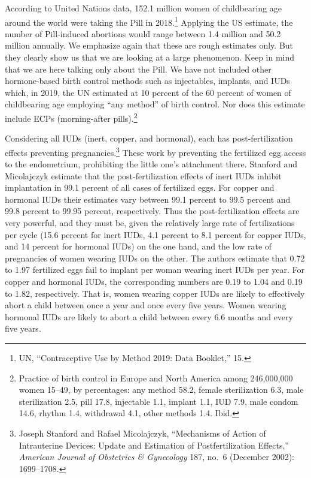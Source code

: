 \documentclass[
]{book}
\begin{document}
According to United Nations data, 152.1 million women of childbearing age around the world were taking the Pill in 2018.\footnote{UN, ``Contraceptive Use by Method 2019: Data Booklet,'' 15.} Applying the US estimate, the number of Pill-induced abortions would range between 1.4 million and 50.2 million annually. We emphasize again that these are rough estimates only. But they clearly show us that we are looking at a large phenomenon. Keep in mind that we are here talking only about the Pill. We have not included other hormone-based birth control methods such as injectables, implants, and IUDs which, in 2019, the UN estimated at 10 percent of the 60 percent of women of childbearing age employing ``any method'' of birth control. Nor does this estimate include ECPs (morning-after pills).\footnote{Practice of birth control in Europe and North America among 246,000,000 women 15--49, by percentages: any method 58.2, female sterilization 6.3, male sterilization 2.5, pill 17.8, injectable 1.1, implant 1.1, IUD 7.9, male condom 14.6, rhythm 1.4, withdrawal 4.1, other methods 1.4. Ibid.}

Considering all IUDs (inert, copper, and hormonal), each has post-fertilization effects preventing pregnancies.\footnote{Joseph Stanford and Rafael Micolajczyk, ``Mechanisms of Action of Intrauterine Devices: Update and Estimation of Postfertilization Effects,'' \emph{American Journal of Obstetrics \& Gynecology} 187, no.~6 (December 2002): 1699--1708.} These work by preventing the fertilized egg access to the endometrium, prohibiting the little one's attachment there. Stanford and Micolajczyk estimate that the post-fertilization effects of inert IUDs inhibit implantation in 99.1 percent of all cases of fertilized eggs. For copper and hormonal IUDs their estimates vary between 99.1 percent to 99.5 percent and 99.8 percent to 99.95 percent, respectively. Thus the post-fertilization effects are very powerful, and they must be, given the relatively large rate of fertilizations per cycle (15.6 percent for inert IUDs, 4.1 percent to 8.1 percent for copper IUDs, and 14 percent for hormonal IUDs) on the one hand, and the low rate of pregnancies of women wearing IUDs on the other. The authors estimate that 0.72 to 1.97 fertilized eggs fail to implant per woman wearing inert IUDs per year. For copper and hormonal IUDs, the corresponding numbers are 0.19 to 1.04 and 0.19 to 1.82, respectively. That is, women wearing copper IUDs are likely to effectively abort a child between once a year and once every five years. Women wearing hormonal IUDs are likely to abort a child between every 6.6 months and every five years.
\end{document}
